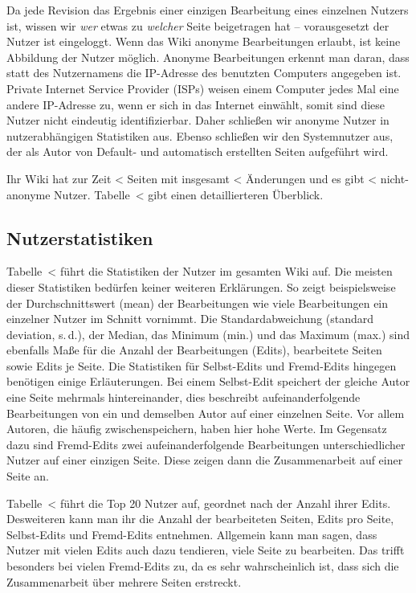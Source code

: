 \documentclass{scrartcl}
\begin{document}
Da jede Revision das Ergebnis einer einzigen Bearbeitung eines einzelnen Nutzers ist, wissen wir \emph{wer} etwas zu \emph{welcher} Seite beigetragen hat -- vorausgesetzt der Nutzer ist eingeloggt. Wenn das Wiki anonyme Bearbeitungen erlaubt, ist keine Abbildung der Nutzer möglich. Anonyme Bearbeitungen erkennt man daran, dass statt des Nutzernamens die IP-Adresse des benutzten Computers angegeben ist. Private Internet Service Provider (ISPs) weisen einem Computer jedes Mal eine andere IP-Adresse zu, wenn er sich in das Internet einwählt, somit sind diese Nutzer nicht eindeutig identifizierbar. Daher schließen wir anonyme Nutzer in nutzerabhängigen Statistiken aus. Ebenso schließen wir den Systemnutzer aus, der als Autor von Default- und automatisch erstellten Seiten aufgeführt wird. 


Ihr Wiki hat zur Zeit <%
Seiten mit insgesamt <%
Änderungen und es gibt <%
nicht-anonyme Nutzer. Tabelle~<%
gibt einen detaillierteren Überblick.

\subsection{Nutzerstatistiken} %
\label{sub:user_statistics}

Tabelle~<%
führt die Statistiken der Nutzer im gesamten Wiki auf. Die meisten dieser Statistiken bedürfen keiner weiteren Erklärungen. So zeigt beispielsweise der Durchschnittswert (mean) der Bearbeitungen wie viele Bearbeitungen ein einzelner Nutzer im Schnitt vornimmt. Die Standardabweichung (standard deviation, s.\,d.), der Median, das Minimum (min.) und das Maximum (max.) sind ebenfalls Maße für die Anzahl der Bearbeitungen (Edits), bearbeitete Seiten sowie Edits je Seite. Die Statistiken für Selbst-Edits und Fremd-Edits hingegen benötigen einige Erläuterungen. 
Bei einem Selbst-Edit speichert der gleiche Autor eine Seite mehrmals hintereinander, dies beschreibt aufeinanderfolgende Bearbeitungen von ein und demselben Autor auf einer einzelnen Seite. Vor allem Autoren, die häufig zwischenspeichern, haben hier hohe Werte. Im Gegensatz dazu sind Fremd-Edits zwei aufeinanderfolgende Bearbeitungen unterschiedlicher Nutzer auf einer einzigen Seite. Diese zeigen dann die Zusammenarbeit auf einer Seite an. 

Tabelle~<%
führt die Top 20 Nutzer auf, geordnet nach der Anzahl ihrer Edits. %
Desweiteren kann man ihr die Anzahl der bearbeiteten Seiten, Edits pro Seite, Selbst-Edits und Fremd-Edits entnehmen. Allgemein kann man sagen, dass Nutzer mit vielen Edits auch dazu tendieren, viele Seite zu bearbeiten. Das trifft besonders bei vielen Fremd-Edits zu, da es sehr wahrscheinlich ist, dass sich die Zusammenarbeit über mehrere Seiten erstreckt. %
\end{document}
